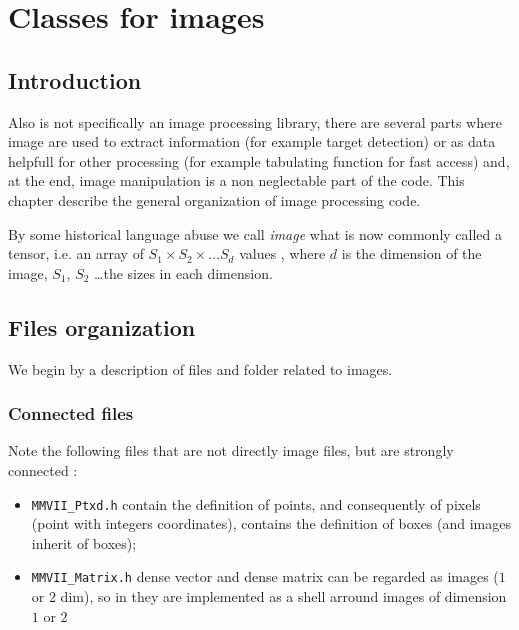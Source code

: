 

\chapter{Classes for images}



\section{Introduction}

Also \PPP is not specifically an image processing library, there are several parts where
image are used to extract information (for example target detection) or as data helpfull 
for other processing (for example tabulating function for fast access) and, 
at the end, image manipulation is a non neglectable part
of the code.
This chapter describe the general organization of image processing code.

By some historical language abuse we call \emph{image} what is now commonly called a tensor,
i.e. an array of $S_1 \times S_2 \times \dots S_d$ values , where $d$ is the dimension
of the image, $S_1$, $S_2$ \dots the sizes in each dimension.




\section{Files organization }

We begin by a description of files and folder related to images.


\subsection{Connected files}

Note the following files that are not directly image files, but are strongly connected :

\begin{itemize}
	\item {\tt MMVII\_Ptxd.h} contain the definition of points, and consequently of pixels (point
		with integers coordinates),  contains the definition of boxes (and images inherit
		of boxes);

	\item {\tt MMVII\_Matrix.h} dense vector and dense matrix can be regarded as images ($1$ or $2$ dim), so in \PPP
		they are implemented as a shell arround  images of dimension $1$ or $2$
\end{itemize}


